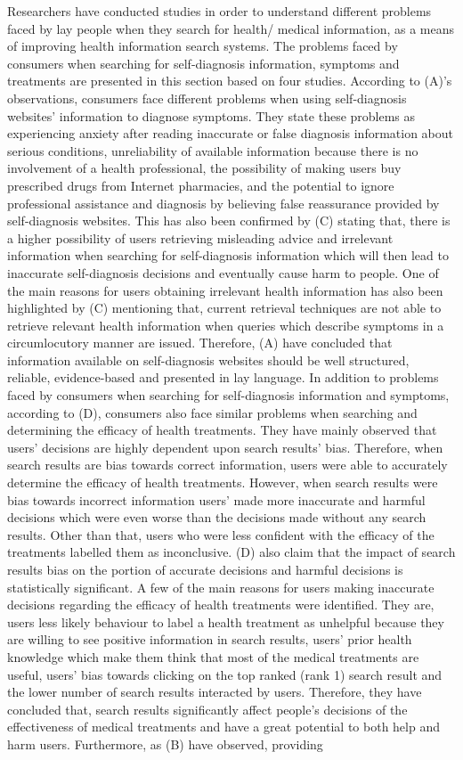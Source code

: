 \documentclass[]{article}
\begin{document}
Researchers have conducted studies in order to understand different problems faced by lay people when they search for health/ medical information, as a means of improving health information search systems. The problems faced by consumers when searching for self-diagnosis information, symptoms and treatments are presented in this section based on four studies. According to (A)'s observations, consumers face different problems when using self-diagnosis websites' information to diagnose symptoms. They state these problems as experiencing anxiety after reading inaccurate or false diagnosis information about serious conditions, unreliability of available information because there is no involvement of a health professional, the possibility of making users buy prescribed drugs from Internet pharmacies, and the potential to ignore professional assistance and diagnosis by believing false reassurance provided by self-diagnosis websites. This has also been confirmed by (C) stating that, there is a higher possibility of users retrieving misleading advice and irrelevant information when searching for self-diagnosis information which will then lead to inaccurate self-diagnosis decisions and eventually cause harm to people. One of the main reasons for users obtaining irrelevant health information has also been highlighted by (C) mentioning that, current retrieval techniques are not able to retrieve relevant health information when queries which describe symptoms in a circumlocutory manner are issued. Therefore, (A) have concluded that information available on self-diagnosis websites should be well structured, reliable, evidence-based and presented in lay language. In addition to problems faced by consumers when searching for self-diagnosis information and symptoms, according to (D), consumers also face similar problems when searching and determining the efficacy of health treatments. They have mainly observed that users' decisions are highly dependent upon search results' bias. Therefore, when search results are bias towards correct information, users were able to accurately determine the efficacy of health treatments. However, when search results were bias towards incorrect information users’ made more inaccurate and harmful decisions which were even worse than the decisions made without any search results. Other than that, users who were less confident with the efficacy of the treatments labelled them as inconclusive. (D) also claim that the impact of search results bias on the portion of accurate decisions and harmful decisions is statistically significant. A few of the main reasons for users making inaccurate decisions regarding the efficacy of health treatments were identified. They are, users less likely behaviour to label a health treatment as unhelpful because they are willing to see positive information in search results, users' prior health knowledge which make them think that most of the medical treatments are useful, users' bias towards clicking on the top ranked (rank 1) search result and the lower number of search results interacted by users. Therefore, they have concluded that, search results significantly affect people’s decisions of the effectiveness of medical treatments and have a great potential to both help and harm users. Furthermore, as (B) have observed, providing 
\end{document}
